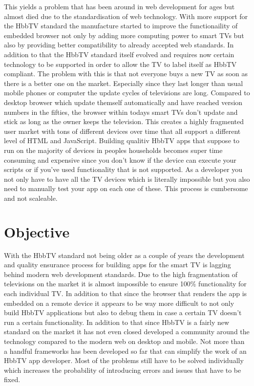 This yields a problem that has been around in web development for ages but almost died due to the standardisation
of web technology. With more support for the HbbTV standard the manufacture started to improve the functionaility
of embedded browser not only by adding more computing power to smart TVs but also by providing better compatibility
to already accepted web standards. In addition to that the HbbTV standard itself evolved and requires now certain
technology to be supported in order to allow the TV to label itself as HbbTV compliant. The problem with this is
that not everyone buys a new TV as soon as there is a better one on the market. Especially since they last longer
than usual mobile phones or computer the update cycles of televisions are long. Compared to desktop browser which
update themself automatically and have reached version numbers in the fifties, the browser within todays smart
TVs don't update and stick as long as the owner keeps the television. This creates a highly fragmented
user market with tons of different devices over time that all support a different level of HTML and JavaScript.
Building qualitiv HbbTV apps that suppose to run on the majority of devices in peoples households becomes super
time consuming and expensive since you don't know if the device can execute your scripts or if you've used
functionality that is not supported. As a developer you not only have to have all the TV devices which is literally
impossible but you also need to manually test your app on each one of these. This process is cumbersome and not
scaleable.

\section{Objective\label{sec:objective}}

With the HbbTV standard not being older as a couple of years the development and quality ensurance process for
building apps for the smart TV is lagging behind modern web development standards. Due to the high fragmentation
of televisions on the market it is almost impossible to ensure 100\% functionality for each individual TV.
In addition to that since the browser that renders the app is embedded on a remote device it appears to be
way more difficult to not only build HbbTV applications but also to debug them in case a certain TV doesn't
run a certain functionality. In addition to that since HbbTV is a fairly new standard on the market it has not
even closed developed a community around the technology compared to the modern web on desktop and mobile. Not
more than a handful frameworks has been developed so far that can simplify the work of an HbbTV app developer. Most
of the problems still have to be solved individually which increases the probability of introducing errors and
issues that have to be fixed.

